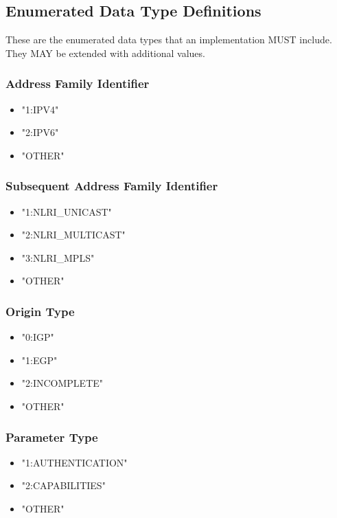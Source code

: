 \documentclass{article}
\begin{document}
\subsection{Enumerated Data Type Definitions}
\label{ENUMS}
These are the enumerated data types that an implementation MUST include.  They MAY be extended with additional values.

\subsubsection{Address Family Identifier}
\begin{itemize}
\item{"1:IPV4"}
\item{"2:IPV6"}
\item{"OTHER"}
\end{itemize}

\subsubsection{Subsequent Address Family Identifier}
\begin{itemize}
\item{"1:NLRI_UNICAST"}
\item{"2:NLRI_MULTICAST"}
\item{"3:NLRI_MPLS"}
\item{"OTHER"}
\end{itemize}

\subsubsection{Origin Type}
\begin{itemize}
\item{"0:IGP"}
\item{"1:EGP"}
\item{"2:INCOMPLETE"}
\item{"OTHER"}
\end{itemize}

\subsubsection{Parameter Type}
\begin{itemize}
\item{"1:AUTHENTICATION"}
\item{"2:CAPABILITIES"}
\item{"OTHER"}
\end{itemize}
\end{document}
